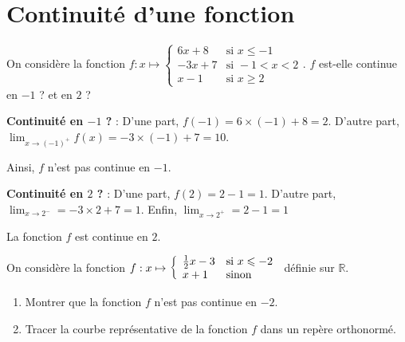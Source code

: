 \documentclass[11pt,fleqn, openany]{book} %
\begin{document}
\section*{Continuité d'une fonction}

\begin{exercise}[topic=cont01] On considère la fonction \renewcommand{\arraystretch}{1}$f:x\mapsto \left\{ \begin{array}{ll}
6x+8 & \text{si }x\leqslant -1\\
-3x+7 & \text{si }-1< x < 2\\
x-1 & \text{si } x \geqslant 2
\end{array}\right. .$  $f$ est-elle continue en $-1$ ? et en $2$ ?
\end{exercise}

\begin{solution}

\textbf{Continuité en $-1$ ?} :  D'une part, $f(-1)=6\times (-1)+8=2$. D'autre part, $\displaystyle \lim_{x \to (-1)^+} f(x)= -3 \times (-1) +7=10$.

Ainsi, $f$ n'est pas continue en $-1$.

\textbf{Continuité en $2$ ?} : D'une part, $f(2)=2-1=1$. D'autre part, $\displaystyle \lim _{x \to 2^-}=-3\times 2 + 7 = 1$. Enfin, $\displaystyle \lim _{x \to 2^+}=2-1= 1$

La fonction $f$ est continue en $2$.\end{solution}



\begin{exercise}[topic=cont01]On considère la fonction $f:x\mapsto \left\{ \renewcommand{\arraystretch}{1} \begin{array}{ll}
\frac{1}{2}x -3 & \text{si }x\leqslant -2\\
x+1 & \text{sinon }
\end{array}\right.$ définie sur $\mathbb{R}$.
\vskip10pt
\begin{enumerate}
\item Montrer que la fonction $f$ n'est pas continue en $-2$.
\item Tracer la courbe représentative de la fonction $f$ dans un repère orthonormé.
\end{enumerate}\end{exercise}
\end{document}
